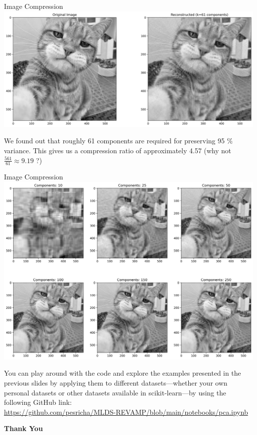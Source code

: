 \documentclass{beamer}
\begin{document}
\begin{frame}{Image Compression}
    \centering
    \includegraphics[width=0.9\linewidth]{images/pca/reconstructed_cat.png}

    We found out that roughly 61 components are required for preserving 95 \% variance. This gives us a compression ratio of approximately 4.57 (why not $\frac{561}{61} \approx 9.19$ ?)
    
\end{frame}

\begin{frame}{Image Compression}
    \centering
    \includegraphics[width=0.9\linewidth]{images/pca/reconstructed_cat_grid.png}
    
\end{frame}

\begin{frame}
  You can play around with the code and explore the examples presented in the previous slides by applying them to different datasets—whether your own personal datasets or other datasets available in scikit-learn—by using the following GitHub link:\\
    \vspace{1cm}
  \url{https://github.com/pesricha/MLDS-REVAMP/blob/main/notebooks/pca.ipynb}
\end{frame}



\begin{frame}{}
    \LARGE \centering \textbf{Thank You}
\end{frame}
\end{document}
